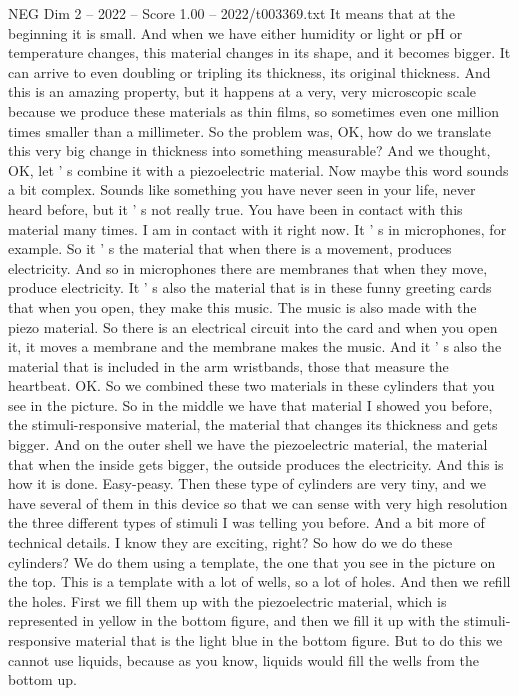 \begin{textsample}{NEG Dim 2 – 2022 – Score 1.00 – 2022/t003369.txt}
It means that at the beginning it is small.
And when we have either humidity or light or pH or temperature changes, this material changes in its shape, and it becomes bigger.
It can arrive to even doubling or tripling its thickness, its original thickness.
And this is an amazing property, but it happens at a very, very microscopic scale because we produce these materials as thin films, so sometimes even one million times smaller than a millimeter.
So the problem was, OK, how do we translate this very big change in thickness into something measurable?
And we thought, OK, let ' s combine it with a piezoelectric material.
Now maybe this word sounds a bit complex.
Sounds like something you have never seen in your life, never heard before, but it ' s not really true.
You have been in contact with this material many times.
I am in contact with it right now.
It ' s in microphones, for example.
So it ' s the material that when there is a movement, produces electricity.
And so in microphones there are membranes that when they move, produce electricity.
It ' s also the material that is in these funny greeting cards that when you open, they make this music.
The music is also made with the piezo material.
So there is an electrical circuit into the card and when you open it, it moves a membrane and the membrane makes the music.
And it ' s also the material that is included in the arm wristbands, those that measure the heartbeat.
OK.
So we combined these two materials in these cylinders that you see in the picture.
So in the middle we have that material I showed you before, the stimuli-responsive material, the material that changes its thickness and gets bigger.
And on the outer shell we have the piezoelectric material, the material that when the inside gets bigger, the outside produces the electricity.
And this is how it is done.
Easy-peasy.
Then these type of cylinders are very tiny, and we have several of them in this device so that we can sense with very high resolution the three different types of stimuli I was telling you before.
And a bit more of technical details.
I know they are exciting, right?
So how do we do these cylinders?
We do them using a template, the one that you see in the picture on the top.
This is a template with a lot of wells, so a lot of holes.
And then we refill the holes.
First we fill them up with the piezoelectric material, which is represented in yellow in the bottom figure, and then we fill it up with the stimuli-responsive material that is the light blue in the bottom figure.
But to do this we cannot use liquids, because as you know, liquids would fill the wells from the bottom up.

\end{textsample}
